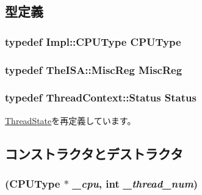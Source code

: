 \subsection{型定義}
\hypertarget{structOzoneThreadState_ad0cc927c8534eaba1d99c29b2942311f}{
\subsubsection[{CPUType}]{\setlength{\rightskip}{0pt plus 5cm}typedef Impl::CPUType {\bf CPUType}}}
\label{structOzoneThreadState_ad0cc927c8534eaba1d99c29b2942311f}
\hypertarget{structOzoneThreadState_aaf5f073a387db0556d1db4bcc45428bc}{
\subsubsection[{MiscReg}]{\setlength{\rightskip}{0pt plus 5cm}typedef TheISA::MiscReg {\bf MiscReg}}}
\label{structOzoneThreadState_aaf5f073a387db0556d1db4bcc45428bc}
\hypertarget{structOzoneThreadState_a3af29dcea6d2bbb0a1de56f02ec789f1}{
\subsubsection[{Status}]{\setlength{\rightskip}{0pt plus 5cm}typedef {\bf ThreadContext::Status} {\bf Status}}}
\label{structOzoneThreadState_a3af29dcea6d2bbb0a1de56f02ec789f1}


\hyperlink{structThreadState_a3af29dcea6d2bbb0a1de56f02ec789f1}{ThreadState}を再定義しています。

\subsection{コンストラクタとデストラクタ}
\hypertarget{structOzoneThreadState_a8c1ba550756f8d9217041ba9ed9e04a3}{
\subsubsection[{OzoneThreadState}]{ ({\bf CPUType} $\ast$ {\em \_\-cpu}, \/  int {\em \_\-thread\_\-num})}}
\label{structOzoneThreadState_a8c1ba550756f8d9217041ba9ed9e04a3}




